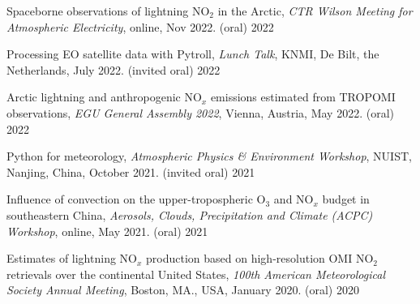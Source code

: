

\begin{cvpresentations}

\publication
{Spaceborne observations of lightning NO$_2$ in the Arctic,
\emph{CTR Wilson Meeting for Atmospheric Electricity},
online, Nov 2022. (oral)} %
{2022} %


\publication
{Processing EO satellite data with Pytroll,
\emph{Lunch Talk},
KNMI, De Bilt, the Netherlands, July 2022. (invited oral)} %
{2022} %

\publication
{Arctic lightning and anthropogenic NO$_x$ emissions estimated from TROPOMI observations,
\emph{EGU General Assembly 2022},
Vienna, Austria, May 2022. (oral)} %
{2022} %

\publication
{Python for meteorology,
\emph{Atmospheric Physics \& Environment Workshop},
NUIST, Nanjing, China, October 2021. (invited oral)} %
{2021} %

\publication
{Influence of convection on the upper-tropospheric O$_3$ and NO$_x$ budget in southeastern China,
\emph{Aerosols, Clouds, Precipitation and Climate (ACPC) Workshop},
online, May 2021. (oral)} %
{2021} %


\publication
{Estimates of lightning NO$_x$ production based on high-resolution OMI NO$_2$ retrievals over the continental United States,
\emph{100th American Meteorological Society Annual Meeting},
Boston, MA., USA, January 2020. (oral)} %
{2020} %


\end{cvpresentations}
